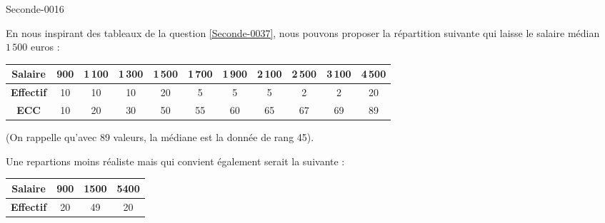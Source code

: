 
\begin{corrige}{Seconde-0016}

  
    En nous inspirant des tableaux de la question \ref{Seconde-0037}, nous pouvons proposer la répartition suivante qui laisse le salaire médian $1\,500$ euros :

  \begin{center}
  \begin{tabular}{|c||c|c|c|c|c|c|c|c|c|c|}
    \hline 
    \textbf{Salaire} &900&1\,100&1\,300&1\,500&1\,700&1\,900&2\,100&2\,500&3\,100&4\,500\\
    \hline 
    \textbf{Effectif} &10&10&10&20&5&5&5&2&2&20\\
    \hline 
    \textbf{ECC} &10&20&30&50&55&60&65&67&69&89\\
    \hline
  \end{tabular}
  \end{center}

  (On rappelle qu'avec 89 valeurs, la médiane est la donnée de rang
  45).

  Une repartions moins réaliste mais qui convient également serait la suivante :
  \begin{center}
      \begin{tabular}[h]{|c||c|c|c|}
          \hline
          \textbf{Salaire} & 900&1500&5400\\
          \hline
          \textbf{Effectif}&20&49&20\\
          \hline
      \end{tabular}
  \end{center}

\end{corrige}
